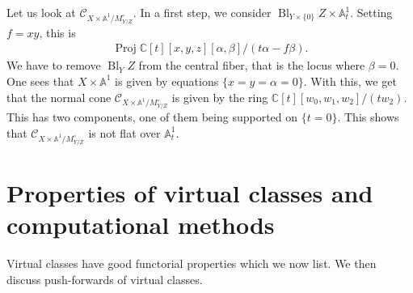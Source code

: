 \documentclass[pdftex]{sigma}
\numberwithin{equation}{section}
\newcommand{\Proj}{\operatorname{Proj}}
\begin{document}
\begin{Remark}Let us look at $\mathcal C_{X\times\mathbb A^1/M_{Y/Z}^\circ}$. In a first step, we consider $\operatorname{Bl}_{Y\times\{0\}}Z\times\mathbb A^1_t$. Setting $f=xy$, this is \begin{gather*}\Proj \mathbb C[t][x,y,z][\alpha,\beta]/(t\alpha-f\beta).\end{gather*} We have to remove $\operatorname{Bl}_{Y}Z$ from the central fiber, that is the locus where $\beta=0$. One sees that $X\times \mathbb A^1$ is given by equations $\{x=y=\alpha=0\}$. With this, we get that the normal cone $\mathcal C_{X\times\mathbb A^1/M_{Y/Z}^\circ}$ is given by the ring $\mathbb C[t][w_0,w_1,w_2]/(tw_2)$. This has two components, one of them being supported on $\{t=0\}$. This shows that $\mathcal C_{X\times\mathbb A^1/M_{Y/Z}^\circ}$ is not flat over $\mathbb A^1_t$.
\end{Remark}

\section{Properties of virtual classes and computational methods}\label{properties}

Virtual classes have good functorial properties which we now list. We then discuss push-forwards of virtual classes.
\end{document}
